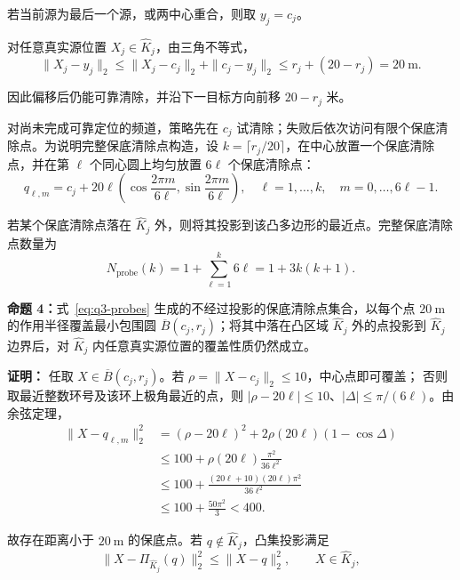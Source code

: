 若当前源为最后一个源，或两中心重合，则取 $y_j=c_j$。

对任意真实源位置 $X_j\in\widehat K_j$，由三角不等式，
\begin{equation}
  \|X_j-y_j\|_2
  \leq\|X_j-c_j\|_2+\|c_j-y_j\|_2
  \leq r_j+(20-r_j)=20\ \mathrm m.
\end{equation}

因此偏移后仍能可靠清除，并沿下一目标方向前移 $20-r_j$ 米。

对尚未完成可靠定位的频道，策略先在 $c_j$ 试清除；失败后依次访问有限个保底清除点。为说明完整保底清除点构造，设 $k=\lceil r_j/20\rceil$，在中心放置一个保底清除点，并在第 $\ell$ 个同心圆上均匀放置 $6\ell$ 个保底清除点：
\begin{equation}
  q_{\ell,m}=c_j+20\ell
  \left(\cos\frac{2\pi m}{6\ell},
  \sin\frac{2\pi m}{6\ell}\right),
  \quad
  \ell=1,\ldots,k,\quad m=0,\ldots,6\ell-1.
  \label{eq:q3-probes}
\end{equation}

若某个保底清除点落在 $\widehat K_j$ 外，则将其投影到该凸多边形的最近点。完整保底清除点数量为
\begin{equation}
  N_{\mathrm{probe}}(k)=1+\sum_{\ell=1}^{k}6\ell
  =1+3k(k+1).
  \label{eq:q3-probe-count}
\end{equation}

\noindent\textbf{命题 4：}{\kaishu 式~\eqref{eq:q3-probes} 生成的不经过投影的保底清除点集合，以每个点 $20\ \mathrm{m}$ 的作用半径覆盖最小包围圆 $\overline B(c_j,r_j)$；将其中落在凸区域 $\widehat K_j$ 外的点投影到 $\widehat K_j$ 边界后，对 $\widehat K_j$ 内任意真实源位置的覆盖性质仍然成立。}

\noindent\textbf{证明：}
任取 $X\in\overline B(c_j,r_j)$。若 $\rho=\|X-c_j\|_2\leq10$，中心点即可覆盖；
否则取最近整数环号及该环上极角最近的点，则
$|\rho-20\ell|\leq10$、$|\Delta|\leq\pi/(6\ell)$。由余弦定理，
\begin{align}
  \|X-q_{\ell,m}\|_2^2
  &=(\rho-20\ell)^2+2\rho(20\ell)(1-\cos\Delta)\\
  &\leq100+\rho(20\ell)\frac{\pi^2}{36\ell^2}\\
  &\leq100+\frac{(20\ell+10)(20\ell)\pi^2}{36\ell^2}\\
  &\leq100+\frac{50\pi^2}{3}<400.
\end{align}

故存在距离小于 $20\ \mathrm m$ 的保底点。若 $q\notin\widehat K_j$，凸集投影满足
\begin{equation}
  \|X-\Pi_{\widehat K_j}(q)\|_2^2
  \leq\|X-q\|_2^2,
  \qquad X\in\widehat K_j,
\end{equation}

